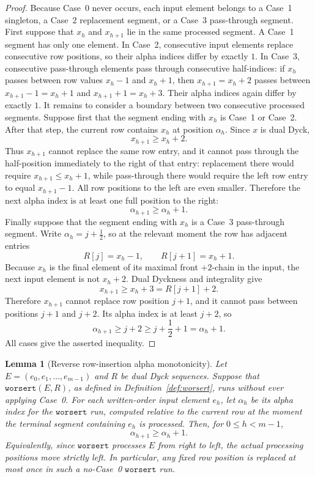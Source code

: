 \documentclass[11pt]{article}
\theoremstyle{plain}
\newtheorem{lemma}[theorem]{Lemma}
\theoremstyle{definition}
\theoremstyle{remark}
\newcommand{\worsert}{\texttt{worsert}}
\begin{document}
\begin{proof}
Because Case~0 never occurs, each input element belongs to a Case~1 singleton,
a Case~2 replacement segment, or a Case~3 pass-through segment.
First suppose that \(x_h\) and \(x_{h+1}\) lie in the same processed segment.  A
Case~1 segment has only one element.  In Case~2, consecutive input elements
replace consecutive row positions, so their alpha indices differ by exactly
\(1\).  In Case~3, consecutive pass-through elements pass through consecutive
half-indices: if \(x_h\) passes between row values \(x_h-1\) and \(x_h+1\), then
\(x_{h+1}=x_h+2\) passes between \(x_{h+1}-1=x_h+1\) and
\(x_{h+1}+1=x_h+3\).  Their alpha indices again differ by exactly \(1\).
It remains to consider a boundary between two consecutive processed segments.
Suppose first that the segment ending with \(x_h\) is Case~1 or Case~2.  After
that step, the current row contains \(x_h\) at position \(\alpha_h\).  Since
\(x\) is dual Dyck,
\[
  x_{h+1}\ge x_h+2.
\]
Thus \(x_{h+1}\) cannot replace the same row entry, and it cannot pass through
the half-position immediately to the right of that entry: replacement there
would require \(x_{h+1}\le x_h+1\), while pass-through there would require the
left row entry to equal \(x_{h+1}-1\).  All row positions to the left are even
smaller.  Therefore the next alpha index is at least one full position to the
right:
\[
  \alpha_{h+1}\ge \alpha_h+1.
\]
Finally suppose that the segment ending with \(x_h\) is a Case~3 pass-through
segment.  Write \(\alpha_h=j+\frac12\), so at the relevant moment the row has
adjacent entries
\[
  R[j]=x_h-1,
  \qquad
  R[j+1]=x_h+1.
\]
Because \(x_h\) is the final element of its maximal front \(+2\)-chain in the
input, the next input element is not \(x_h+2\).  Dual Dyckness and integrality
give
\[
  x_{h+1}\ge x_h+3=R[j+1]+2.
\]
Therefore \(x_{h+1}\) cannot replace row position \(j+1\), and it cannot pass
between positions \(j+1\) and \(j+2\).  Its alpha index is at least \(j+2\), so
\[
  \alpha_{h+1}\ge j+2\ge j+\frac12+1=\alpha_h+1.
\]
All cases give the asserted inequality.
\end{proof}
\begin{lemma}[Reverse row-insertion alpha monotonicity]
\label{lem:worsert-alpha-monotonicity}
Let \(E=(e_0,e_1,\ldots,e_{m-1})\) and \(R\) be dual Dyck sequences.  Suppose
that \(\worsert(E,R)\), as defined in Definition~\ref{def:worsert}, runs without
ever applying Case~0.  For each written-order input element \(e_h\), let
\(\alpha_h\) be its alpha index for the
\(\worsert\) run, computed relative to the current row at the moment the
terminal segment containing \(e_h\) is processed.  Then, for \(0\le h<m-1\),
\[
  \alpha_{h+1}\ge \alpha_h+1.
\]
Equivalently, since \(\worsert\) processes \(E\) from right to left, the actual
processing positions move strictly left.  In particular, any fixed row position
is replaced at most once in such a no-Case~0 \(\worsert\) run.
\end{lemma}
\end{document}
